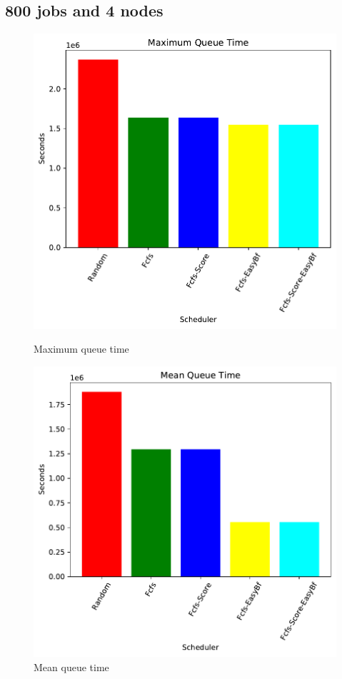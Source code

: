 \documentclass[a4paper]{article}
\begin{document}
	\subsection{800 jobs and 4 nodes}
	\begin{figure}[H]
	\begin{minipage}[b]{0.5\linewidth}\centering\includegraphics[width=1.11\linewidth]{MBSS/plot/2021-05-23-800_Maximum_queue_time.pdf}\caption{Maximum queue time}\vspace{4ex}\end{minipage}
	\begin{minipage}[b]{0.5\linewidth}\centering\includegraphics[width=1.11\linewidth]{MBSS/plot/2021-05-23-800_Mean_queue_time.pdf}\caption{Mean queue time}\vspace{4ex}\end{minipage} 

\end{figure}
\end{document}
